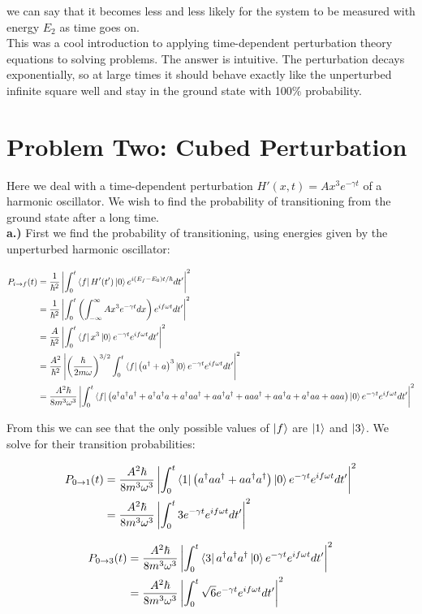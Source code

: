 \documentclass[10pt]{article} %
\begin{document}
we can say that it becomes less and less likely for the system to be measured with energy
$E_2$ as time goes on.\\

This was a cool introduction to applying time-dependent perturbation theory equations to solving
problems. The answer is intuitive. The perturbation decays exponentially, so at large times it
should behave exactly like the unperturbed infinite square well and stay in the ground state with
100\% probability.\\

\section{Problem Two: Cubed Perturbation}
Here we deal with a time-dependent perturbation $H'(x,t) = Ax^3e^{-\gamma t}$
of a harmonic oscillator. We wish to find the probability of transitioning from the ground
state after a long time.\\

\textbf{a.)} First we find the probability of transitioning, using energies given by the unperturbed
harmonic oscillator:

\begin{align*}
  P_{i\rightarrow f}(t)
  &= \frac{1}{\hbar^2}\left|\int_0^t\bra{f}H'(t')\ket{0}e^{i(E_f-E_0)t/\hbar}dt'\right|^2\\
  &= \frac{1}{\hbar^2}\left|\int_0^t
  \left(\int_{-\infty}^\infty Ax^3e^{-\gamma t}dx\right)e^{if\omega t}dt'\right|^2\\
  &= \frac{A}{\hbar^2}\left|\int_0^t\bra{f}x^3\ket{0}e^{-\gamma t}e^{if\omega t}dt'\right|^2\\
  &= \frac{A^2}{\hbar^2}\left|\left(\frac{\hbar}{2m\omega}\right)^{3/2}
  \int_0^t\bra{f}\left(a^\dagger+a\right)^3\ket{0}e^{-\gamma t}e^{if\omega t}dt'\right|^2\\
  &= \frac{A^2\hbar}{8m^3\omega^3}
  \left|\int_0^t\bra{f}
  \left(a^\dagger a^\dagger a^\dagger + a^\dagger a^\dagger a + a^\dagger aa^\dagger
  + aa^\dagger a^\dagger + aaa^\dagger + aa^\dagger a + a^\dagger aa + aaa\right)
  \ket{0}e^{-\gamma t}e^{if\omega t}dt'\right|^2\\
\end{align*}

From this we can see that the only possible values of $\ket{f}$ are $\ket{1}$ and $\ket{3}$. We
solve for their transition probabilities:

\begin{align*}
  P_{0\rightarrow 1}(t) &= \frac{A^2\hbar}{8m^3\omega^3}
  \left|\int_0^t\bra{1}\left(a^\dagger aa^\dagger + aa^\dagger a^\dagger\right)
  \ket{0}e^{-\gamma t}e^{if\omega t}dt'\right|^2\\
  &= \frac{A^2\hbar}{8m^3\omega^3}\left|\int_0^t3e^{-\gamma t}e^{if\omega t}dt'\right|^2\\
\end{align*}

\begin{align*}
  P_{0\rightarrow 3}(t) &= \frac{A^2\hbar}{8m^3\omega^3}
  \left|\int_0^t\bra{3}a^\dagger a^\dagger a^\dagger\ket{0}e^{-\gamma t}e^{if\omega t}dt'\right|^2\\
  &= \frac{A^2\hbar}{8m^3\omega^3}\left|\int_0^t\sqrt{6}e^{-\gamma t}e^{if\omega t}dt'\right|^2\\
\end{align*}
\end{document}
